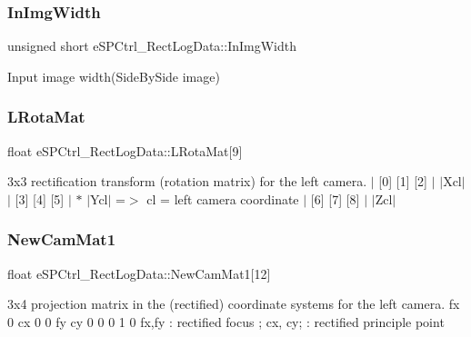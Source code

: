 \subsubsection{\texorpdfstring{In\+Img\+Width}{InImgWidth}}
{\footnotesize\ttfamily unsigned short e\+S\+P\+Ctrl\+\_\+\+Rect\+Log\+Data\+::\+In\+Img\+Width}

Input image width(\+Side\+By\+Side image) \mbox{\label{structe_s_p_ctrl___rect_log_data_a488d2a2a2bf4babde99a2bfa77c58248}} 
\subsubsection{\texorpdfstring{L\+Rota\+Mat}{LRotaMat}}
{\footnotesize\ttfamily float e\+S\+P\+Ctrl\+\_\+\+Rect\+Log\+Data\+::\+L\+Rota\+Mat\mbox{[}9\mbox{]}}

3x3 rectification transform (rotation matrix) for the left camera. $\vert$ \mbox{[}0\mbox{]} \mbox{[}1\mbox{]} \mbox{[}2\mbox{]} $\vert$ $\vert$\+Xcl$\vert$ $\vert$ \mbox{[}3\mbox{]} \mbox{[}4\mbox{]} \mbox{[}5\mbox{]} $\vert$ $\ast$ $\vert$\+Ycl$\vert$ =$>$ cl = left camera coordinate $\vert$ \mbox{[}6\mbox{]} \mbox{[}7\mbox{]} \mbox{[}8\mbox{]} $\vert$ $\vert$\+Zcl$\vert$ \mbox{\label{structe_s_p_ctrl___rect_log_data_a22cdbfc7717089b3739b21675da9ae66}} 
\subsubsection{\texorpdfstring{New\+Cam\+Mat1}{NewCamMat1}}
{\footnotesize\ttfamily float e\+S\+P\+Ctrl\+\_\+\+Rect\+Log\+Data\+::\+New\+Cam\+Mat1\mbox{[}12\mbox{]}}

3x4 projection matrix in the (rectified) coordinate systems for the left camera. fx\textquotesingle{} 0 cx\textquotesingle{} 0 0 fy\textquotesingle{} cy\textquotesingle{} 0 0 0 1 0 fx\textquotesingle{},fy\textquotesingle{} \+: rectified focus ; cx\textquotesingle{}, cy; \+: rectified principle point \mbox{\label{structe_s_p_ctrl___rect_log_data_a94f449d9063c1015d26046bf9542b667}} 
